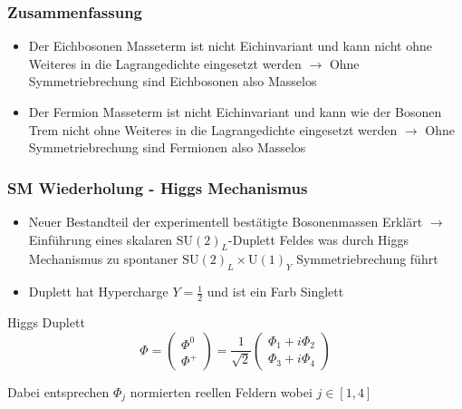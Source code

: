 \documentclass{beamer}
\begin{document}
\begin{frame}
\frametitle{Zusammenfassung}
\begin{itemize}
\item Der Eichbosonen Masseterm ist nicht Eichinvariant und kann nicht ohne Weiteres in die Lagrangedichte  eingesetzt werden $\rightarrow$ Ohne Symmetriebrechung sind Eichbosonen also Masselos
\item Der Fermion Masseterm ist nicht Eichinvariant und kann wie der Bosonen Trem  nicht ohne Weiteres in die Lagrangedichte  eingesetzt werden $\rightarrow$ Ohne Symmetriebrechung sind Fermionen also Masselos
\end{itemize}
\end{frame}
\begin{frame}
\frametitle{SM Wiederholung - Higgs Mechanismus }
\begin{itemize}
\item Neuer Bestandteil der experimentell bestätigte Bosonenmassen Erklärt $\rightarrow$ Einführung eines skalaren $\text{SU}(2)_{L}$-Duplett Feldes was durch Higgs Mechanismus zu spontaner $\text{SU}(2)_{L}\times\text{U}(1)_{Y}$ Symmetriebrechung führt
\item Duplett hat Hypercharge $Y=\frac{1}{2}$ und ist ein Farb Singlett 
\end{itemize}

\begin{block}{Higgs Duplett}
\begin{equation}
\Phi=\left( \begin{array}{c} \Phi^{0}\\ \Phi^{+} \end{array}\right)= \frac{1}{\sqrt{2}}\left( \begin{array}{c} \Phi_{1}+i\Phi_{2}\\ \Phi_{3}+i\Phi_{4} \end{array}\right)
\end{equation}
\end{block}
Dabei entsprechen $\Phi_{j}$  normierten reellen Feldern wobei $j \in [1,4] $
\end{frame}
\end{document}
